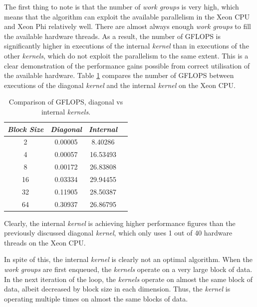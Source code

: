 \par{The first thing to note is that the number of \emph{work groups} is very high, 
    which means that the algorithm can exploit the available parallelism 
    in the Xeon CPU and Xeon Phi relatively well. There are almost always 
    enough \emph{work groups} to fill the available hardware threads. As a result, 
    the number of GFLOPS is significantly higher in executions of the internal 
    \emph{kernel} than in executions of the other \emph{kernels}, which do not exploit the 
    parallelism to the same extent. This is a clear demonstration of the 
    performance gains possible from correct utilisation of 
    the available hardware. Table \ref{tab:lu4} compares the number of 
    GFLOPS between executions of the diagonal \emph{kernel} and the internal 
    \emph{kernel} on the Xeon CPU.}

\begin{table}[!h]
    \centering
    \begin{tabular}{| c | c | c | c |}
    \hline
    \emph{Block Size} & \emph{Diagonal} & \emph{Internal} \\ \hline
    2 & 0.00005 & 8.40286 \\ \hline
    4 & 0.00057 & 16.53493 \\ \hline
    8 & 0.00172 & 26.83808 \\ \hline
    16 & 0.03334 & 29.94455 \\ \hline
    32 & 0.11905 & 28.50387 \\ \hline
    64 & 0.30937 & 26.86795 \\ \hline
    \end{tabular}
    \caption{Comparison of GFLOPS, diagonal vs internal \emph{kernels}.}
    \label{tab:lu4}
\end{table}

\par{Clearly, the internal \emph{kernel} is achieving higher performance 
    figures than the previously discussed diagonal \emph{kernel}, which 
    only uses 1 out of 40 hardware threads on the Xeon CPU.}

\par{In spite of this, the internal \emph{kernel} is clearly not an optimal 
    algorithm. When the \emph{work groups} are first enqueued, the \emph{kernels} 
    operate on a very large block of data. In the next iteration of 
    the loop, the \emph{kernels} operate on almost the same block of data, 
    albeit decreased by block size in each dimension. Thus, 
    the \emph{kernel} is operating multiple times on almost the same blocks of data.}

